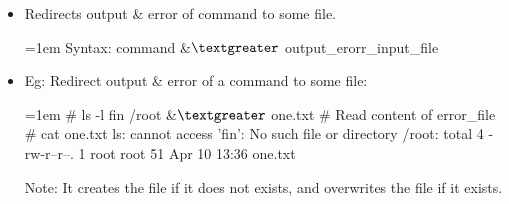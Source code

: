 \setlength{\columnsep}{3pt}
\begin{flushleft}

	\begin{itemize}
	\item Redirects output \& error of command to some file.
	\bigskip
	\begin{tcolorbox}[breakable,notitle,boxrule=-0pt,colback=pink,colframe=pink]
		\color{black}
		\font=1em
		Syntax: command \&{$\textgreater$} output\_erorr\_input\_file
		\font=4pt
	\end{tcolorbox}
	\item
	Eg: Redirect output \& error of a command to some file:
	\bigskip
	\begin{tcolorbox}[breakable,notitle,boxrule=-0pt,colback=black,colframe=black]
		\color{green}
		\font=1em
		\# ls -l fin /root \&{$\textgreater$} one.txt
		\newline
		\newline
		\color{yellow}
		\# Read content of error\_file
		\color{green}
		\newline
		\# cat one.txt
		\newline
		\color{white}
		ls: cannot access 'fin': No such file or directory
		\newline
		/root:
		\color{white}
		\newline
		total 4
		\color{white}
		\newline
		\color{white} -rw-r--r--. 1 root root 51 Apr 10 13:36 one.txt
		\font=4pt
	\end{tcolorbox}
	\bigskip
	\begin{tcolorbox}[breakable,notitle,boxrule=1pt,colback=yellow,colframe=yellow]
		\color{black}
		Note: It creates the file if it does not exists, and overwrites the file if it exists.
	\end{tcolorbox}
\end{itemize}
	

	
\end{flushleft}
\newpage


